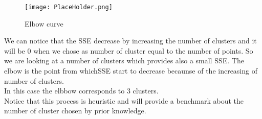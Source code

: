 \documentclass{standalone}
\begin{document}
	\begin{figure}[h!]
		\centering
			\texttt{[image: PlaceHolder.png]}
		\label{fig:ElbowCurve}\caption{Elbow curve}
	\end{figure}

	We can notice that the SSE decrease by increasing the number of clusters and it will be $0$ when we chose as number of cluster equal to the number of points. So we are looking at a number of clusters which provides also a small SSE. The elbow is the point from whichSSE start to decrease becaunse of the increasing of number of clusters.\\ In this case the elbbow corresponds to 3 clusters. \\
	
	Notice that this process is heuristic and will provide a benchmark about the number of cluster chosen by prior knowledge. 
	
	
	
\end{document}
